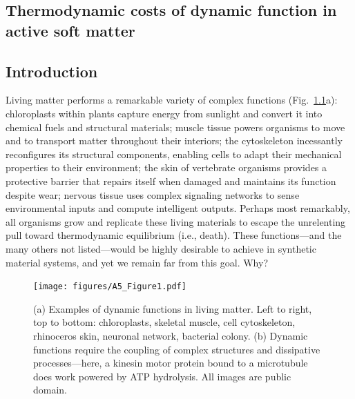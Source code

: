 %


\begin{appendices}



\chapter{Thermodynamic costs of dynamic function in active soft matter}




\section{Introduction}

Living matter performs a remarkable variety of complex functions (Fig.~\ref{fig:1}a): chloroplasts within plants capture energy from sunlight and convert it into chemical fuels and structural materials; muscle tissue powers organisms to move and to transport matter throughout their interiors; the cytoskeleton incessantly reconfigures its structural components, enabling cells to adapt their mechanical properties to their environment; the skin of vertebrate organisms provides a protective barrier that repairs itself when damaged and maintains its function despite wear; nervous tissue uses complex signaling networks to sense environmental inputs and compute intelligent outputs.  Perhaps most remarkably, all organisms grow and replicate these living materials to escape the unrelenting pull toward thermodynamic equilibrium (i.e., death). These functions---and the many others not listed---would be highly desirable to achieve in synthetic material systems, and yet we remain far from this goal. Why?

\begin{figure}[!p]
     \centering
     \texttt{[image: figures/A5\_Figure1.pdf]}
     \caption{(a) Examples of dynamic functions in living matter. Left to right, top to bottom: chloroplasts, skeletal muscle, cell cytoskeleton, rhinoceros skin, neuronal network, bacterial colony. (b) Dynamic functions require the coupling of complex structures and dissipative processes---here, a kinesin motor protein bound to a microtubule does work powered by ATP hydrolysis. All images are public domain. }
     \label{fig:1}
 \end{figure}


\end{appendices}

